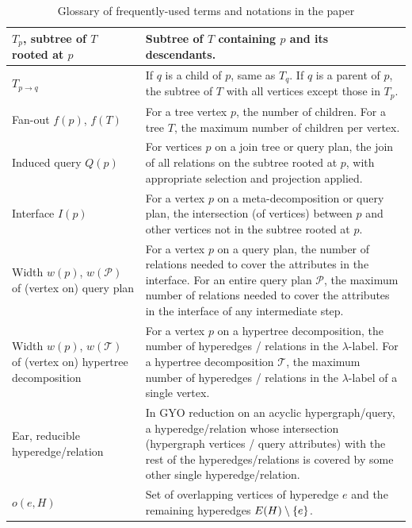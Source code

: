 \begin{small}
\begin{table}[H]
\begin{tabular}{>{\raggedright\arraybackslash}p{3.5cm}>{\raggedright\arraybackslash}p{9.5cm}}
        $T_p$, subtree of $T$ rooted at $p$ & Subtree of $T$ containing $p$ and its descendants. \\ \hline
        $T_{p \to q}$ & If $q$ is a child of $p$, same as $T_q$. If $q$ is a parent of $p$, the subtree of $T$ with all vertices except those in $T_p$. \\ \hline
        Fan-out $f(p)$, $f(T)$ & For a tree vertex $p$, the number of children. For a tree $T$, the maximum number of children per vertex. \\ \hline
        Induced query $Q(p)$ & For vertices $p$ on a join tree or query plan, the join of all relations on the subtree rooted at $p$, with appropriate selection and projection applied. \\ \hline
        Interface $I(p)$ & For a vertex $p$ on a meta-decomposition or query plan, the intersection (of vertices) between $p$ and other vertices not in the subtree rooted at $p$. \\ \hline
        Width $w(p)$, $w(\mathcal{P})$ of (vertex on) query plan & For a vertex $p$ on a query plan, the number of relations needed to cover the attributes in the interface. \newline For an entire query plan $\mathcal{P}$, the maximum number of relations needed to cover the attributes in the interface of any intermediate step. \\ \hline
        Width $w(p)$, $w(\mathcal{T})$ of (vertex on) hypertree decomposition & For a vertex $p$ on a hypertree decomposition, the number of hyperedges / relations in the $\lambda$-label. \newline For a hypertree decomposition $\mathcal{T}$, the maximum number of hyperedges / relations in the $\lambda$-label of a single vertex. \\ \hline
        Ear, reducible hyperedge/relation & In GYO reduction on an acyclic hypergraph/query, a hyperedge/relation whose intersection (hypergraph vertices / query attributes) with the rest of the hyperedges/relations is covered by some other single hyperedge/relation. \\ \hline
        $o(e, H)$ & Set of overlapping vertices of hyperedge $e$ and the remaining hyperedges $E(H) \setminus \lbrace e\rbrace$. \\ \hline
    \end{tabular}
    \caption{Glossary of frequently-used terms and notations in the paper}
    \label{tab:glossary}
\end{table}
\end{small}